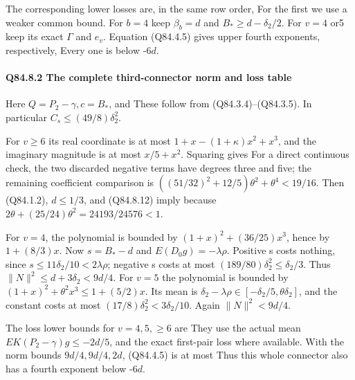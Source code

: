 The corresponding lower losses are, in the same row order,
For the first we use a weaker common bound. For \(b=4\) keep
\(\beta_b=d\) and \(B_*\ge d-\delta_2/2\). For \(v=4\) or5 keep its exact \(\Gamma\) and \(e_v\).
Equation (Q84.4.5) gives upper fourth exponents, respectively,
Every one is below -\(6d\).

\paragraph{Q84.8.2 The complete third-connector norm and loss table}

Here \(Q=P_2-\gamma,\allowbreak  c=B_*\), and
These follow from (Q84.3.4)--(Q84.3.5). In particular
\(C_s\le(49/8)\delta_2^2\).

For \(v\ge 6\) its real coordinate is at most
\(1+x-(1+\kappa)x^2+x^3\), and the imaginary magnitude is at most
\(x/5+x^2\). Squaring gives
For a direct continuous check, the two discarded negative terms have
degrees three and five; the remaining coefficient comparison is
\(( (51/32)^2+12/5)\theta^2+\theta^4<19/16\).
Then (Q84.1.2), \(d\le 1/3\), and (Q84.8.12) imply
because \(2\theta+(25/24)\theta^2=24193/24576<1\).

For \(v=4\), the polynomial is bounded by
\((1+x)^2+(36/25)x^3\), hence by \(1+(8/3)x\).
Now \(s=B_*-d\) and \(E(D_0g)=-\lambda\rho\). Positive s costs nothing,
since \(s\le11\delta_2/10<2\lambda\rho\); negative s costs at most
\((189/80)\delta_2^2\le \delta_2/3\). Thus \(\|N\|^2\le d+3\delta_2<9d/4\).
For \(v=5\) the polynomial is bounded by
\((1+x)^2+\theta^2x^3\le1+(5/2)x\). Its mean is
\(\delta_2-\lambda\rho\in[-\delta_2/5,\allowbreak  \theta \delta_2]\), and the constant costs
at most \((17/8)\delta_2^2<3\delta_2/10\). Again \(\|N\|^2<9d/4\).

The loss lower bounds for \(v=4,\allowbreak  5,\allowbreak \ge 6\) are
They use the actual mean
\(EK(P_2-\gamma)g\le-2d/5\), and the exact first-pair loss where
available. With the norm bounds \(9d/4,\allowbreak  9d/4,\allowbreak  2d\), (Q84.4.5) is at most
Thus this whole connector also has a fourth exponent below -\(6d\).

